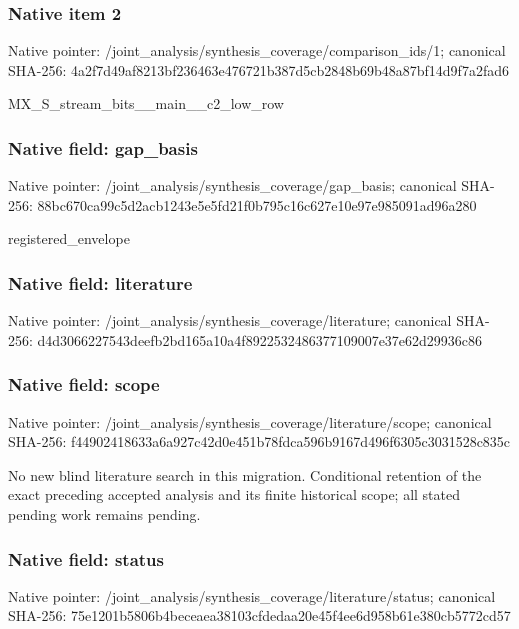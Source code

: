 \documentclass[10pt,a4paper]{article}
\begin{document}
\subsubsection{Native item 2}
Native pointer: /joint\_\allowbreak{}analysis/synthesis\_\allowbreak{}coverage/comparison\_\allowbreak{}ids/1; canonical SHA-256: 4a2f7d49af8213bf236463e476721b387d5cb2848b69b48a87bf14d9f7a2fad6

\begingroup\raggedright\sloppy MX\_\allowbreak{}S\_\allowbreak{}stream\_\allowbreak{}bits\_\allowbreak{}\_\allowbreak{}main\_\allowbreak{}\_\allowbreak{}c2\_\allowbreak{}low\_\allowbreak{}row\par\endgroup

\subsubsection{Native field: gap\_\allowbreak{}basis}
Native pointer: /joint\_\allowbreak{}analysis/synthesis\_\allowbreak{}coverage/gap\_\allowbreak{}basis; canonical SHA-256: 88bc670ca99c5d2acb1243e5e5fd21f0b795c16c627e10e97e985091ad96a280

\begingroup\raggedright\sloppy registered\_\allowbreak{}envelope\par\endgroup

\subsubsection{Native field: literature}
Native pointer: /joint\_\allowbreak{}analysis/synthesis\_\allowbreak{}coverage/literature; canonical SHA-256: d4d3066227543deefb2bd165a10a4f8922532486377109007e37e62d29936c86

\subsubsection{Native field: scope}
Native pointer: /joint\_\allowbreak{}analysis/synthesis\_\allowbreak{}coverage/literature/scope; canonical SHA-256: f44902418633a6a927c42d0e451b78fdca596b9167d496f6305c3031528c835c

\begingroup\raggedright\sloppy No new blind literature search in this migration. Conditional retention of the exact preceding accepted analysis and its finite historical scope;\allowbreak{} all stated pending work remains pending.\par\endgroup

\subsubsection{Native field: status}
Native pointer: /joint\_\allowbreak{}analysis/synthesis\_\allowbreak{}coverage/literature/status; canonical SHA-256: 75e1201b5806b4beceaea38103cfdedaa20e45f4ee6d958b61e380cb5772cd57
\end{document}
